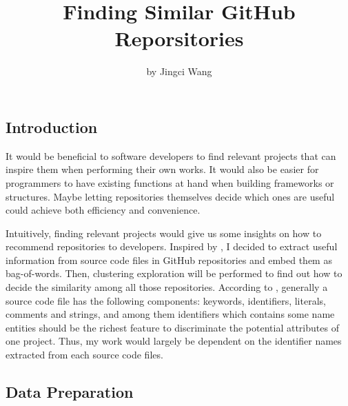 \title{Finding Similar GitHub Reporsitories}
\author{by Jingci Wang}

\maketitle



\hypertarget{introduction}{%
\subsection{Introduction}\label{introduction}}

It would be beneficial to software developers to find relevant projects
that can inspire them when performing their own works. It would also be
easier for programmers to have existing functions at hand when building
frameworks or structures. Maybe letting repositories themselves decide
which ones are useful could achieve both efficiency and convenience.

Intuitively, finding relevant projects would give us some insights on
how to recommend repositories to developers. Inspired by
\citet{Markovtsev:2017aa}, I decided to extract useful information from
source code files in GitHub repositories and embed them as bag-of-words.
Then, clustering exploration will be performed to find out how to decide
the similarity among all those repositories. According to
\citet{Markovtsev:2017aa}, generally a source code file has the
following components: keywords, identifiers, literals, comments and
strings, and among them identifiers which contains some name entities
should be the richest feature to discriminate the potential attributes
of one project. Thus, my work would largely be dependent on the
identifier names extracted from each source code files.

\hypertarget{data-preparation}{%
\subsection{Data Preparation}\label{data-preparation}}

